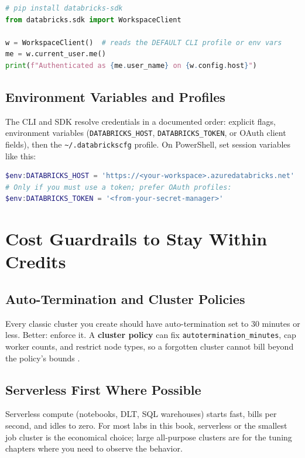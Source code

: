 \begin{lstlisting}[language=Python,caption={SDK installation check and identity call.},label={lst:ch0-sdk-check}]
# pip install databricks-sdk
from databricks.sdk import WorkspaceClient

w = WorkspaceClient()  # reads the DEFAULT CLI profile or env vars
me = w.current_user.me()
print(f"Authenticated as {me.user_name} on {w.config.host}")
\end{lstlisting}

\subsection{Environment Variables and Profiles}
The CLI and SDK resolve credentials in a documented order: explicit flags, environment variables (\texttt{DATABRICKS\_HOST}, \texttt{DATABRICKS\_TOKEN}, or OAuth client fields), then the \texttt{\textasciitilde/.databrickscfg} profile. On PowerShell, set session variables like this:

\begin{lstlisting}[language=PowerShell,caption={Session-scoped credential environment variables.},label={lst:ch0-env-vars}]
$env:DATABRICKS_HOST = 'https://<your-workspace>.azuredatabricks.net'
# Only if you must use a token; prefer OAuth profiles:
$env:DATABRICKS_TOKEN = '<from-your-secret-manager>'
\end{lstlisting}

\section{Cost Guardrails to Stay Within Credits}
\subsection{Auto-Termination and Cluster Policies}
Every classic cluster you create should have auto-termination set to 30 minutes or less. Better: enforce it. A \textbf{cluster policy} can fix \texttt{autotermination\_minutes}, cap worker counts, and restrict node types, so a forgotten cluster cannot bill beyond the policy's bounds \cite{databricksCompute}.

\subsection{Serverless First Where Possible}
Serverless compute (notebooks, DLT, SQL warehouses) starts fast, bills per second, and idles to zero. For most labs in this book, serverless or the smallest job cluster is the economical choice; large all-purpose clusters are for the tuning chapters where you need to observe the behavior.

